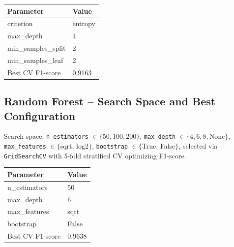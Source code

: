 \documentclass[12pt,a4paper]{article}
\begin{document}
\begin{tabular}{ll}
\toprule
Parameter & Value\\
\midrule
criterion & entropy \\
max\_depth & 4 \\
min\_samples\_split & 2 \\
min\_samples\_leaf & 2 \\
\midrule
Best CV F1-score & 0.9163 \\
\bottomrule
\end{tabular}

\subsection*{Random Forest -- Search Space and Best Configuration}
Search space: \texttt{n\_estimators} $\in \{50,100,200\}$, \texttt{max\_depth} $\in \{4,6,8,$None$\}$,
\texttt{max\_features} $\in \{$sqrt, log2$\}$, \texttt{bootstrap} $\in \{$True, False$\}$,
selected via \texttt{GridSearchCV} with 5-fold stratified CV optimizing F1-score.

\begin{tabular}{ll}
\toprule
Parameter & Value\\
\midrule
n\_estimators & 50 \\
max\_depth & 6 \\
max\_features & sqrt \\
bootstrap & False \\
\midrule
Best CV F1-score & 0.9638 \\
\bottomrule
\end{tabular}
\end{document}
